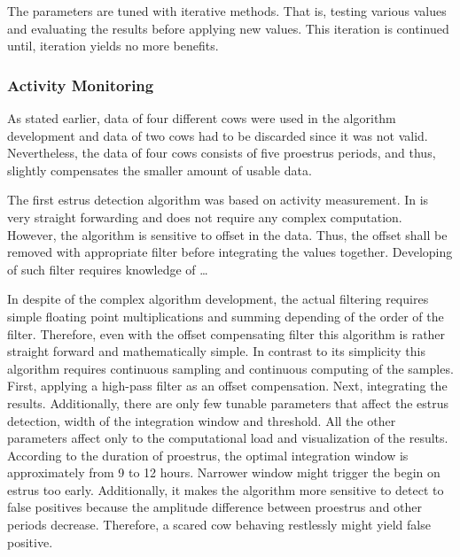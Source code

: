 \documentclass[english,12pt,a4paper,pdftex,elec,utf8]{aaltothesis}
\begin{document}
The parameters are tuned with iterative methods. That is, testing various values and evaluating the results before applying new values. This iteration is continued until, iteration yields no more benefits.


\subsubsection{Activity Monitoring} \label{activitymeasurementevaluation}






As stated earlier, data of four different cows were used in the algorithm development and data of two cows had to be discarded since it was not valid. Nevertheless, the data of four cows consists of five proestrus periods, and thus, slightly compensates the smaller amount of usable data.

The first estrus detection algorithm was based on activity measurement. In is very straight forwarding and does not require any complex computation. However, the algorithm is sensitive to offset in the data. Thus, the offset shall be removed with appropriate filter before integrating the values together. Developing of such filter requires knowledge of \dots

In despite of the complex algorithm development, the actual filtering requires simple floating point multiplications and summing depending of the order of the filter. Therefore, even with the offset compensating filter this algorithm is rather straight forward and mathematically simple. In contrast to its simplicity this algorithm requires continuous sampling and continuous computing of the samples. First, applying a high-pass filter as an offset compensation. Next, integrating the results. Additionally, there are only few tunable parameters that affect the estrus detection, width of the integration window and threshold. All the other parameters affect only to the computational load and visualization of the results.\\

According to the duration of proestrus, the optimal integration window is approximately from 9 to 12 hours. Narrower window might trigger the begin on estrus too early. Additionally, it makes the algorithm more sensitive to detect to false positives because the amplitude difference between proestrus and other periods decrease. Therefore, a scared cow behaving restlessly might yield false positive.
\end{document}

